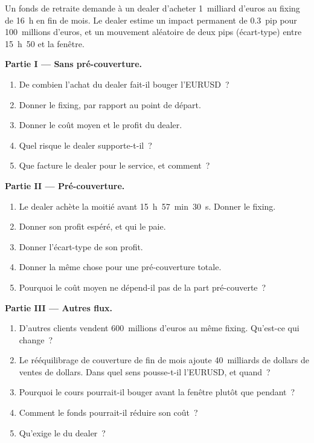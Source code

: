 \begin{problem}\label{pb:m2:fixings-and-flows:1}
Un fonds de retraite demande à un dealer d'acheter 1~milliard d'euros au fixing de 16~h en fin de mois.
Le dealer estime un impact permanent de 0.3~pip pour 100~millions d'euros, et un
mouvement aléatoire de deux pips (écart-type) entre 15~h~50 et la fenêtre.

\medskip\noindent\textbf{Partie I --- Sans pré-couverture.}
\begin{enumerate}
\item De combien l'achat du dealer fait-il bouger l'EURUSD~?
\item Donner le fixing, par rapport au point de départ.
\item Donner le coût moyen et le profit du dealer.
\item Quel risque le dealer supporte-t-il~?
\item Que facture le dealer pour le service, et comment~?
\end{enumerate}

\medskip\noindent\textbf{Partie II --- Pré-couverture.}
\begin{enumerate}[resume]
\item Le dealer achète la moitié avant 15~h~57~min~30~s. Donner le fixing.
\item Donner son profit espéré, et qui le paie.
\item Donner l'écart-type de son profit.
\item Donner la même chose pour une pré-couverture totale.
\item Pourquoi le coût moyen ne dépend-il pas de la part pré-couverte~?
\end{enumerate}

\medskip\noindent\textbf{Partie III --- Autres flux.}
\begin{enumerate}[resume]
\item D'autres clients vendent 600~millions d'euros au même fixing. Qu'est-ce qui change~?
\item Le rééquilibrage de couverture de fin de mois ajoute 40~milliards de dollars de ventes de dollars. Dans quel
sens pousse-t-il l'EURUSD, et quand~?
\item Pourquoi le cours pourrait-il bouger avant la fenêtre plutôt que pendant~?
\item Comment le fonds pourrait-il réduire son coût~?
\item Qu'exige le  du dealer~?
\end{enumerate}


\end{problem}
